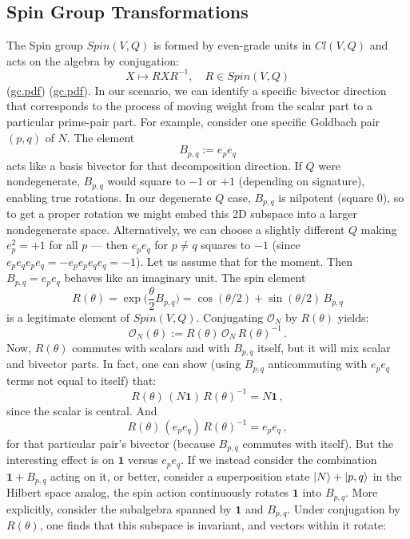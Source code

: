 \documentclass[12pt]{article}
\begin{document}
\subsection{Spin Group Transformations}
The Spin group $Spin(V,Q)$ is formed by even-grade units in $Cl(V,Q)$ and acts on the algebra by conjugation:
\[
X \mapsto R X R^{-1}, \quad R\in Spin(V,Q)
\]
(\href{file://file-7ZYYwSHWVa83XEVTrEhg5z#:~:text=The%20Clifford%20algebra%20provides%20a,Because%20the%20Clifford%20algebra}{gc.pdf}) (\href{file://file-7ZYYwSHWVa83XEVTrEhg5z#:~:text=bivectors%29%20in%20one%20algebraic%20object,Lie%20group%20inside%20the%20Clifford}{gc.pdf}). In our scenario, we can identify a specific bivector direction that corresponds to the process of moving weight from the scalar part to a particular prime-pair part. For example, consider one specific Goldbach pair $(p,q)$ of $N$. The element
\[
B_{p,q}:= e_p e_q
\]
acts like a basis bivector for that decomposition direction. If $Q$ were nondegenerate, $B_{p,q}$ would square to $-1$ or $+1$ (depending on signature), enabling true rotations. In our degenerate $Q$ case, $B_{p,q}$ is nilpotent (square $0$), so to get a proper rotation we might embed this 2D subspace into a larger nondegenerate space. Alternatively, we can choose a slightly different $Q$ making $e_p^2=+1$ for all $p$ --- then $e_p e_q$ for $p\neq q$ squares to $-1$ (since $e_p e_q e_p e_q = -e_p e_p e_q e_q = -1$). Let us assume that for the moment. Then $B_{p,q} = e_p e_q$ behaves like an imaginary unit. The spin element 
\[
R(\theta) = \exp\!\Big(\frac{\theta}{2} B_{p,q}\Big) = \cos(\theta/2) + \sin(\theta/2)\,B_{p,q}
\]
is a legitimate element of $Spin(V,Q)$. Conjugating $\mathcal{O}_N$ by $R(\theta)$ yields:
\[
\mathcal{O}_N(\theta) := R(\theta)\,\mathcal{O}_N\,R(\theta)^{-1}\,.
\]
Now, $R(\theta)$ commutes with scalars and with $B_{p,q}$ itself, but it will mix scalar and bivector parts. In fact, one can show (using $B_{p,q}$ anticommuting with $e_p e_q$ terms not equal to itself) that:
\[
R(\theta)\,(N\mathbf{1})\,R(\theta)^{-1} = N\mathbf{1}\,,
\]
since the scalar is central. And
\[
R(\theta)\,(e_p e_q)\,R(\theta)^{-1} = e_p e_q\,,
\]
for that particular pair’s bivector (because $B_{p,q}$ commutes with itself). But the interesting effect is on $\mathbf{1}$ versus $e_p e_q$. If we instead consider the combination $\mathbf{1} + B_{p,q}$ acting on it, or better, consider a superposition state $\ket{N} + \ket{p,q}$ in the Hilbert space analog, the spin action continuously rotates $\mathbf{1}$ into $B_{p,q}$. More explicitly, consider the subalgebra spanned by $\mathbf{1}$ and $B_{p,q}$. Under conjugation by $R(\theta)$, one finds that this subspace is invariant, and vectors within it rotate:
\end{document}
